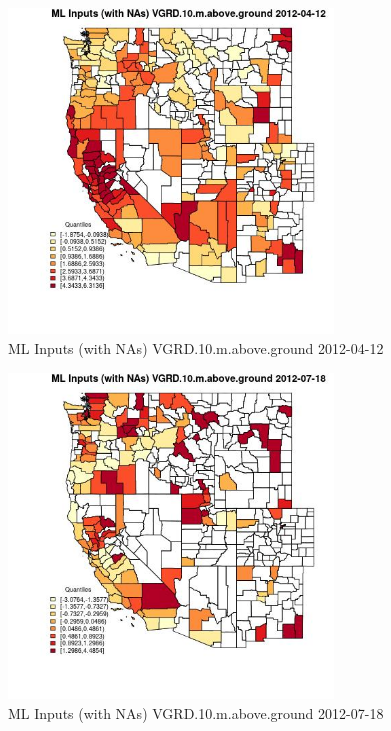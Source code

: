\begin{figure} 
\centering  
\includegraphics[width=0.77\textwidth]{Code_Outputs/Report_ML_input_PM25_Step4_part_e_de_duplicated_aves_compiled_2019-05-14wNAs_CountyVGRD10mabovegroundMean2012-04-12_2012-04-12.jpg} 
\caption{\label{fig:Report_ML_input_PM25_Step4_part_e_de_duplicated_aves_compiled_2019-05-14wNAsCountyVGRD10mabovegroundMean2012-04-12_2012-04-12}ML Inputs (with NAs) VGRD.10.m.above.ground 2012-04-12} 
\end{figure} 
 

\begin{figure} 
\centering  
\includegraphics[width=0.77\textwidth]{Code_Outputs/Report_ML_input_PM25_Step4_part_e_de_duplicated_aves_compiled_2019-05-14wNAs_CountyVGRD10mabovegroundMean2012-07-18_2012-07-18.jpg} 
\caption{\label{fig:Report_ML_input_PM25_Step4_part_e_de_duplicated_aves_compiled_2019-05-14wNAsCountyVGRD10mabovegroundMean2012-07-18_2012-07-18}ML Inputs (with NAs) VGRD.10.m.above.ground 2012-07-18} 
\end{figure} 
 

